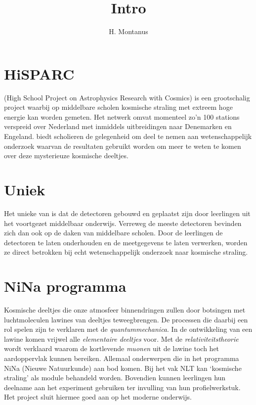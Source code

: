 



\title{Intro}
\author{H. Montanus}
\date{}

\maketitle


\section{HiSPARC}

\hisparc (High School Project on Astrophysics Research with Cosmics) is
een grootschalig project waarbij op middelbare scholen kosmische straling met extreem hoge energie kan worden gemeten. Het \hisparc netwerk omvat momenteel zo'n 100 stations verspreid over Nederland met inmiddels uitbreidingen naar
Denemarken en Engeland. \hisparc biedt scholieren de gelegenheid om deel te nemen aan wetenschappelijk onderzoek waarvan de resultaten gebruikt worden om meer te weten te komen over deze mysterieuze kosmische deeltjes.


\section{Uniek}

Het unieke van \hisparc is dat de detectoren gebouwd en geplaatst zijn
door leerlingen uit het voortgezet middelbaar onderwijs. Verreweg de
meeste detectoren bevinden zich dan ook op de daken van middelbare
scholen. Door de leerlingen de detectoren te laten onderhouden en de
meetgegevens te laten verwerken, worden ze direct betrokken bij
echt wetenschappelijk onderzoek naar kosmische straling. 


\section{NiNa programma}

Kosmische deeltjes die onze atmosfeer binnendringen zullen door
botsingen met luchtmoleculen lawines van deeltjes teweegbrengen. De
processen die daarbij een rol spelen zijn te verklaren met de
\emph{quantummechanica}. In de ontwikkeling van een lawine komen vrijwel
alle \emph{elementaire deeltjes} voor. Met de
\emph{relativiteitstheorie} wordt verklaard waarom de kortlevende
\emph{muonen} uit de lawine toch het aardoppervlak kunnen bereiken. Allemaal onderwerpen die in het programma NiNa (Nieuwe Natuurkunde) aan bod komen. Bij het vak NLT kan `kosmische straling' als module behandeld worden. Bovendien kunnen leerlingen hun deelname aan het \hisparc experiment gebruiken ter invulling van hun profielwerkstuk. Het \hisparc project sluit hiermee goed aan op het moderne onderwijs.    


